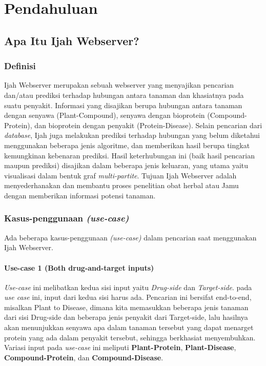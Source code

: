 \chapter{Pendahuluan}

\section{Apa Itu Ijah Webserver?}

	\subsection{Definisi}
	Ijah Webserver merupakan sebuah webserver yang menyajikan pencarian dan/atau prediksi terhadap hubungan antara tanaman dan khasiatnya pada suatu penyakit. Informasi yang disajikan berupa hubungan antara tanaman dengan senyawa (Plant-Compound), senyawa dengan bioprotein (Compound-Protein), dan bioprotein dengan penyakit (Protein-Disease). Selain pencarian dari \emph{database}, Ijah juga melakukan prediksi terhadap hubungan yang belum diketahui menggunakan beberapa jenis algoritme, dan memberikan hasil berupa tingkat kemungkinan kebenaran prediksi. Hasil keterhubungan ini (baik hasil pencarian maupun prediksi) disajikan dalam beberapa jenis keluaran, yang utama yaitu visualisasi dalam bentuk graf \emph{multi-partite}. Tujuan Ijah Webserver adalah menyederhanakan dan membantu proses penelitian obat herbal atau Jamu dengan memberikan informasi potensi tanaman.

	\subsection{Kasus-penggunaan \emph{(use-case)}}
	Ada beberapa kasus-penggunaan \emph{(use-case)} dalam pencarian saat menggunakan Ijah Webserver.
		\subsubsection{Use-case 1 (Both drug-and-target inputs)} \label{end to end}
		\emph{Use-case} ini melibatkan kedua sisi input yaitu \emph{Drug-side} dan \emph{Target-side}. pada \emph{use case} ini, input dari kedua sisi harus ada. Pencarian ini bersifat end-to-end, misalkan Plant to Disease, dimana kita memasukkan beberapa jenis tanaman dari sisi Drug-side dan beberapa jenis penyakit dari Target-side, lalu hasilnya akan menunjukkan senyawa apa dalam tanaman tersebut yang dapat menarget protein yang ada dalam penyakit tersebut, sehingga berkhasiat menyembuhkan. Variasi input pada \emph{use-case} ini meliputi \textbf{Plant-Protein}, \textbf{Plant-Disease}, \textbf{Compound-Protein}, dan \textbf{Compound-Disease}.
